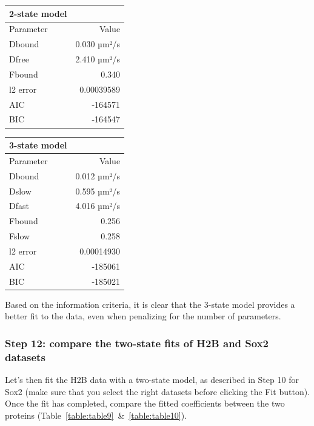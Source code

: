 \begin{center}
  \label{table:table7}
\begin{tabular}{lr}
2-state model & \\
\hline
Parameter & Value\\
\hline
Dbound & 0.030 µm²/s\\
Dfree & 2.410 µm²/s\\
Fbound & 0.340\\
l2 error & 0.00039589\\
AIC & -164571\\
BIC & -164547\\
\end{tabular}
\end{center}

\begin{center}
  \label{table:table8}
\begin{tabular}{lr}
3-state model & \\
\hline
Parameter & Value\\
\hline
Dbound & 0.012 µm²/s\\
Dslow & 0.595 µm²/s\\
Dfast & 4.016 µm²/s\\
Fbound & 0.256\\
Fslow & 0.258\\
l2 error & 0.00014930\\
AIC & -185061\\
BIC & -185021\\
\end{tabular}
\end{center}

Based on the information criteria, it is clear that the 3-state model provides a better fit to the data, even when penalizing for the number of parameters.


\subsubsection{Step 12: compare the two-state fits of H2B and Sox2 datasets}
Let's then fit the H2B data with a two-state model, as described in Step 10 for Sox2 (make sure that you select the right datasets before clicking the Fit button). Once the fit has completed, compare the fitted coefficients between the two proteins (Table~\ref{table:table9}~\&~\ref{table:table10}).

